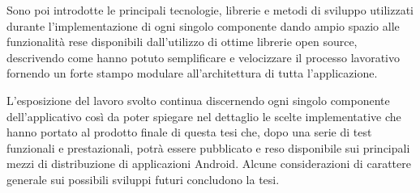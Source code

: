\medskip{}

Sono poi introdotte le principali tecnologie, librerie e metodi di
sviluppo utilizzati durante l’implementazione di ogni singolo componente
dando ampio spazio alle funzionalità rese disponibili dall'utilizzo
di ottime librerie open source, descrivendo come hanno potuto semplificare
e velocizzare il processo lavorativo fornendo un forte stampo modulare
all'architettura di tutta l’applicazione.

\medskip{}

L'esposizione del lavoro svolto continua discernendo ogni singolo
componente dell'applicativo così da poter spiegare nel dettaglio le
scelte implementative che hanno portato al prodotto finale di questa
tesi che, dopo una serie di test funzionali e prestazionali, potrà
essere pubblicato e reso disponibile sui principali mezzi di distribuzione
di applicazioni Android. Alcune considerazioni di carattere generale
sui possibili sviluppi futuri concludono la tesi.

\newpage{}
